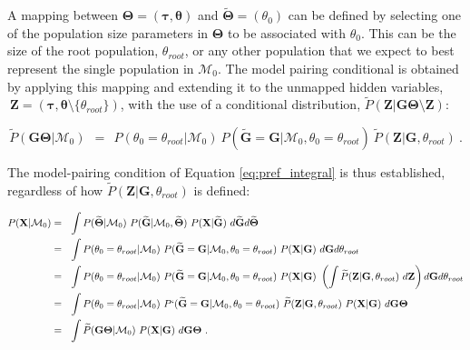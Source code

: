 \documentclass[11pt]{article}
\newcommand{\vect}[1]{\boldsymbol{\mathbf{#1}}}
\newcommand{\X}{\vect{X}}
\newcommand{\M}{\mathcal{M}}
\newcommand{\G}{\vect{G}}
\newcommand{\T}{\vect{\Theta}}
\newcommand{\GT}{\G\T}
\newcommand{\Pref}{\widetilde{P}}
\newcommand{\Gref}{\widetilde{\G}}
\newcommand{\Tref}{\widetilde{\T}}
\newcommand{\1}{\mathbbm{1}}
\newcommand{\Z}{\vect{Z}}
\newcommand{\troot}{\theta_{root}}
\newcommand{\taus}{\vect\tau}
\newcommand{\thetas}{\vect\theta}
\begin{document}
%
A mapping between $\T=(\taus,\thetas)$ and $\Tref=(\theta_0)$ can be defined by selecting one of the population size parameters in $\T$
to be associated with $\theta_0$. This can be the size of the root population, $\troot$, or any other population
that we expect to best represent the single population in $\M_0$.
%
The model pairing conditional is obtained by applying this mapping and extending it to the unmapped hidden variables, $~ \Z=(\taus,\thetas\setminus \{\troot\})$, with the use of a conditional distribution, $\Pref(\Z|\GT\setminus\Z)$:
%
%
\begin{small}
\begin{equation}
 \Pref(\GT|\M_0)  ~~=~~
 P(\theta_0=\troot|\M_0)\ P(\Gref=\G|\M_0,\theta_0=\troot)\ \Pref(\Z|\G,\troot)   ~ .\label{eq:pref_null}
\end{equation}
\end{small}
%
%
The model-pairing condition of Equation \ref{eq:pref_integral} is thus established, regardless of how $\Pref(\Z|\G,\troot)$ is defined:
%
%
\begin{small}
\begin{align}
P(\X|\M_0)
&=~~ \int P(\Tref|\M_0)\ P(\Gref|\M_0,\Tref)\ P(\X|\Gref)\   d\Gref d\Tref  \notag \\ %
&=~~ \int P(\theta_0=\troot|\M_0)\ P(\Gref=\G|\M_0,\theta_0=\troot)\ P(\X|\G)\  d\G d\troot \notag \\ 
&=~~ \int P(\theta_0=\troot|\M_0)\ P(\Gref=\G|\M_0,\theta_0=\troot)\ P(\X|\G)\
\left( \int \Pref(\Z|\G,\troot)\ d\Z \right) d\G d\troot \notag \\ 
%
&=~~ \int P(\theta_0=\troot|\M_0)\ P`(\Gref=\G|\M_0,\theta_0=\troot)\ \Pref(\Z|\G,\troot)\ P(\X|\G)\ d\GT \notag \\ 
&=~~ \int \Pref(\GT|\M_0)\ P(\X|\G)\ d\GT ~. \label{eq:likelihood_null} %
\end{align}
\end{small}
\end{document}
